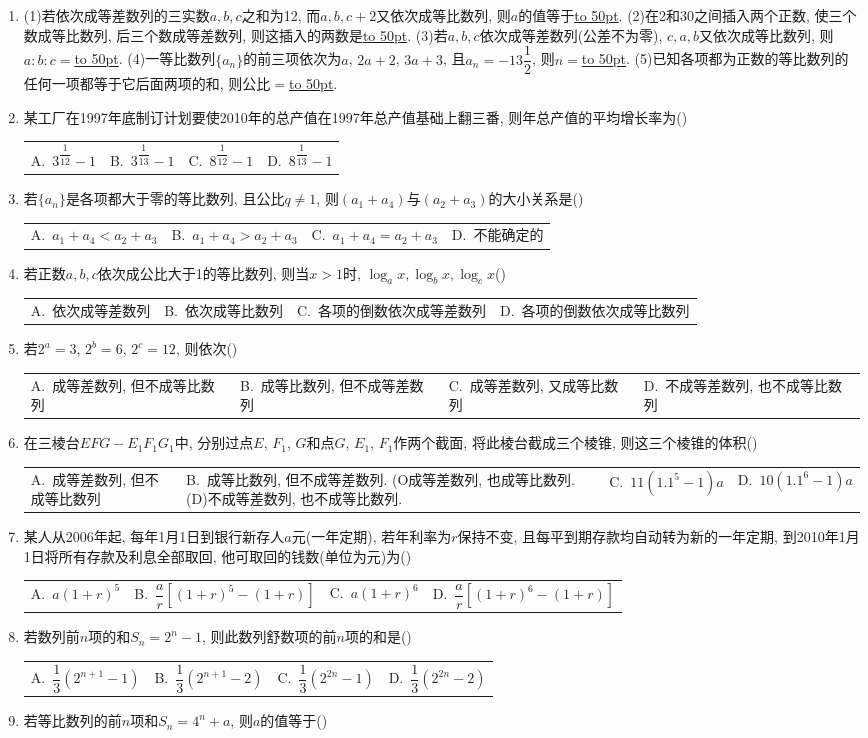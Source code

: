 \documentclass[10pt,a4paper]{article}
\newcommand{\blank}[1]{\underline{\hbox to #1pt{}}}
\newcommand{\fourch}[4]{\par\begin{tabular}{p{.23\textwidth}p{.23\textwidth}p{.23\textwidth}p{.23\textwidth}}
A.~#1 &B.~#2& C.~#3& D.~#4
\end{tabular}}
\begin{document}
\begin{enumerate}[1.]
(5)若数列$\{a_n\}$满足$a_1=1$, $\dfrac{a_n}{{a_n}+{a_{n+1}}}=2$($n\in \mathbf{N}$), 则它的通项$a_n=$\blank{50}.
\item (1)若依次成等差数列的三实数$a,b,c$之和为12, 而$a,b,c+2$又依次成等比数列, 则$a$的值等于\blank{50}.
(2)在2和30之间插入两个正数, 使三个数成等比数列, 后三个数成等差数列, 则这插入的两数是\blank{50}.
(3)若$a,b,c$依次成等差数列(公差不为零), $c,a,b$又依次成等比数列, 则$a:b:c=$\blank{50}.
(4)一等比数列$\{a_n\}$的前三项依次为$a$, $2a+2$, $3a+3$, 且$a_n=-13\dfrac 12$, 则$n=$\blank{50}.
(5)已知各项都为正数的等比数列的任何一项都等于它后面两项的和, 则公比$=$\blank{50}.
\item 某工厂在1997年底制订计划要使2010年的总产值在1997年总产值基础上翻三番, 则年总产值的平均增长率为()
\fourch{$3^{\dfrac 1{12}}-1$}{$3^{\dfrac 1{13}}-1$}{$8^{\dfrac 1{12}}-1$}{$8^{\dfrac 1{13}}-1$}
\item 若$\{a_n\}$是各项都大于零的等比数列, 且公比$q\ne 1$, 则$(a_1+a_4)$与$(a_2+a_3)$的大小关系是()
\fourch{$a_1+a_4<a_2+a_3$}{$a_1+a_4>a_2+a_3$}{$a_1+a_4=a_2+a_3$}{不能确定的}
\item 若正数$a,b,c$依次成公比大于1的等比数列, 则当$x>1$时, $\log _ax,\log _bx,\log _cx$()
\fourch{依次成等差数列}{依次成等比数列}{各项的倒数依次成等差数列}{各项的倒数依次成等比数列}
\item 若$2^a=3$, $2^b=6$, $2^c=12$, 则依次()
\fourch{成等差数列, 但不成等比数列}{成等比数列, 但不成等差数列}{成等差数列, 又成等比数列}{不成等差数列, 也不成等比数列}
\item 在三棱台$EFG-E_1F_1G_1$中, 分别过点$E$, $F_1$, $G$和点$G$, $E_1$, $F_1$作两个截面, 将此棱台截成三个棱锥, 则这三个棱锥的体积()
\fourch{成等差数列, 但不成等比数列}{成等比数列, 但不成等差数列.
(O成等差数列, 也成等比数列.			(D)不成等差数列, 也不成等比数列.
\item 某厂去年产值为$a$, 计划在今后五年内每年比上年产值增长10%
(A)$1.1^4a$.								(B)$1.1^5a$}{$11(1.1^5-1)a$}{$10(1.1^6-1)a$}
\item 某人从2006年起, 每年1月1日到银行新存人$a$元(一年定期), 若年利率为$r$保持不变, 且每平到期存款均自动转为新的一年定期, 到2010年1月1日将所有存款及利息全部取回, 他可取回的钱数(单位为元)为()
\fourch{$a(1+r)^5$}{$\dfrac ar[(1+r)^5-(1+r)]$}{$a(1+r)^6$}{$\dfrac ar[(1+r)^6-(1+r)]$}
\item 若数列前$n$项的和$S_n=2^n-1$, 则此数列舒数项的前$n$项的和是()
\fourch{$\dfrac 13(2^{n+1}-1)$}{$\dfrac 13(2^{n+1}-2)$}{$\dfrac 13(2^{2n}-1)$}{$\dfrac 13(2^{2n}-2)$}
\item 若等比数列的前$n$项和$S_n=4^n+a$, 则$a$的值等于()

\end{enumerate}
\end{document}
